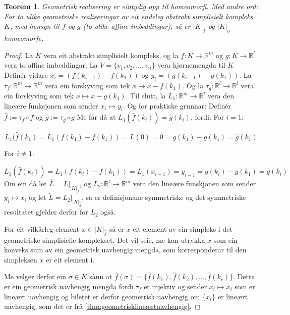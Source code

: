 \documentclass[a4paper, titlepage, 12pt, norsk]{article}
\theoremstyle{plain}
\newtheorem{theorem}{Teorem}[section]
\theoremstyle{definition}
\newcommand{\Rb}{\mathbb{R}}
\newcommand{\gr}[1]{ \lvert #1 \rvert } %
\begin{document}
\begin{theorem}
	Geometrisk realisering er eintydig opp til homeomorfi. Med andre ord: For to ulike geometriske realiseringar av eit endeleg abstrakt simplisielt kompleks $K$, med hensyn til $f$ og $g$ (to ulike affine imbeddingar), så er $\gr{K}_f$ og $\gr{K}_g$ homeomorfe.
\end{theorem}

\begin{proof}%
	La $K$ vera eit abstrakt simplisielt kompleks, og la $f:K\to\Rb^m$ og $g:K\to\Rb^l$ vera to affine imbeddingar. La $V=\{ v_1, v_2, \dots, v_n \}$ vera hjørnemengda til $K$ Definér vidare $x_i=(f(k_{i-1})-f(k_1))$ og $y_i=(g(k_{i-1})-g(k_1))$. La $\tau_f:\Rb^m\to\Rb^m$ vera ein forskyving som tek $x\mapsto x-f(k_1)$. Og la $\tau_g:\Rb^l\to\Rb^l$ vera ein forskyving som tek $x\mapsto x-g(k_1)$. Til slutt, la $L_1:\Rb^m\to\Rb^l$ vera den lineære funksjonen som sender $x_i\mapsto y_i$.
	Og for praktiske grunnar: Definér $\hat{f}:=\tau_f\circ f$ og $\hat{g}:=\tau_g \circ g$
Me får då at $L_1(\hat{f}(k_i))=\hat{g}(k_i)$, fordi:
For $i=1$:

	\begin{equation*}
		L_1(\hat{f}(k_1)=L_1(f(k_1)-f(k_1))=L(0)=0=g(k_1)-g(k_1)=\hat{g}(k_1)
	\end{equation*}

	For $i\neq 1$:

	\begin{equation*}
		L_1(\hat{f}(k_i))=L_1(f(k_i)-f(k_1))=L_1(x_{i-1})=y_{i-1}=g(k_i)-g(k_1)=\hat{g}(k_i)
	\end{equation*}
	Om ein då let $\hat{L}=L|_{\gr{K}_{\hat{f}}}$, og $L_2:\Rb^l\to\Rb^m$ vera den lineære funskjonen som sender $y_i\mapsto x_i$ og let $\tilde{L}=L_2|_{\gr{K}_{\hat{g}}}$, så er definisjonane symmetriske og det symmetriske resultatet gjelder derfor for $L_2$ også.

	For eit vilkårleg element $x\in\gr{K}_{\hat{f}}$ så er $x$ eit element av ein simpleks i det geometriske simplisielle komplekset. Det vil seie, me kan utrykka $x$ som ein konveks sum av ein geometrisk uavhengig mengda, som korresponderar til den simpleksen $x$ er eit element i.
	
	Me velger derfor ein $\sigma\in K$ sånn at $\hat{f}(\sigma)=\{\hat{f}(k_1), \hat{f}(k_2), \dots, \hat{f}(k_r)\}$. Dette er ein geometrisk uavhengig mengda fordi $\tau_f$ er injektiv og sender $x_i\mapsto x_i$ som er lineært uavhengig og biletet er derfor geometrisk uavhengig om $\{x_i\}$ er lineært uavhengig, som det er frå \autoref{thm:geometrisklineærtuavhengig}.
	

\end{proof}
\end{document}
